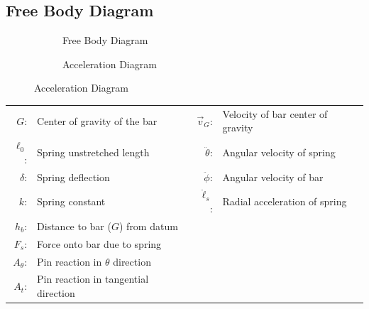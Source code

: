 \documentclass[12pt]{report}
\begin{document}
\begin{flushleft}
\section{Free Body Diagram}
\begin{figure}[!htp]
  \caption{Acceleration and Free Body Diagrams}
   \begin{minipage}[c]{.5\textwidth}
     \begin{subfigure}{\textwidth}
       \center
      
      \vspace{1ex}
      \caption{Free Body Diagram}
      \label{fbd}
      \end{subfigure}
   \end{minipage}%
   \begin{minipage}[c]{.5\textwidth}
     \begin{subfigure}{\textwidth}
       \center
       \vspace{2ex}
       
       \vspace{2ex}
       \caption{Acceleration Diagram}
       \label{ad}
    \end{subfigure}
   \end{minipage}
\end{figure}
\vspace{-2ex}
\begin{tabular}{rl@{\hskip .5in}rl}
  $G$:&Center of gravity of the bar &$\vec{v}_G$:& Velocity of bar center of gravity\\
  $\ell_0$:& Spring unstretched length  &$\ddot{\theta}$:& Angular velocity of spring \\
  $\delta$:& Spring deflection &$\ddot{\phi}$:& Angular velocity of bar\\
  $k$:& Spring constant &$\ddot{\ell}_s$:& Radial acceleration of spring \\
  $h_{b}$:& Distance to bar ($G$) from datum \\
  $F_s$:& Force onto bar due to spring\\
  $A_{\theta}$:& Pin reaction in $\theta$ direction\\
  $A_{t}$:& Pin reaction in tangential direction \\
\end{tabular}


\end{flushleft}
\end{document}
